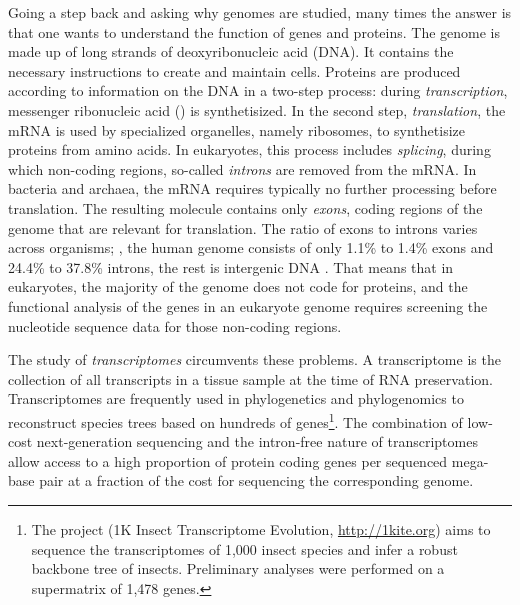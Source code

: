 Going a step back and asking why genomes are studied, many times the answer is
that one wants to understand the function of genes and proteins. The genome is
made up of long strands of deoxyribonucleic acid (DNA). It contains the
necessary instructions to create and maintain cells.  Proteins are produced
according to information on the DNA in a two-step process: during
\emph{transcription}, messenger ribonucleic acid () is synthetisized. In the second step, \emph{translation}, the
mRNA is used by specialized organelles, namely ribosomes, to synthetisize
proteins from amino acids. In eukaryotes, this process includes \emph{splicing},
during which non-coding regions, so-called \emph{introns} are removed from the
mRNA. In bacteria and archaea, the mRNA requires typically no further processing
before translation. The resulting molecule contains only \emph{exons}, coding
regions of the genome that are relevant for translation. The ratio of exons to
introns varies across organisms; \eg, the human genome consists of only 1.1\% to
1.4\% exons and 24.4\% to 37.8\% introns, the rest is intergenic DNA
\citep{venter2001}. That means that in eukaryotes, the majority of the genome
does not code for proteins, and the functional analysis of the genes in an
eukaryote genome requires screening the nucleotide sequence data for those
non-coding regions.

The study of \emph{transcriptomes} circumvents these problems. A transcriptome
is the collection of all transcripts in a tissue sample at the time of RNA
preservation.  Transcriptomes are frequently used in phylogenetics and
phylogenomics to reconstruct species trees based on hundreds of
genes\footnote{The 
project (1K Insect Transcriptome Evolution, \url{http://1kite.org}) aims to
sequence the transcriptomes of 1,000 insect species and infer a robust backbone
tree of insects. Preliminary analyses were performed on a supermatrix of 1,478
genes.}.  The combination of low-cost next-generation sequencing and the
intron-free nature of transcriptomes allow access to a high proportion of
protein coding genes per sequenced mega-base pair at a fraction of the cost for
sequencing the corresponding genome.

